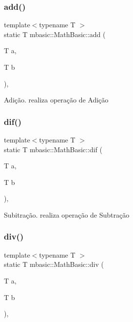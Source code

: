 \subsubsection{\texorpdfstring{add()}{add()}}
{\footnotesize\ttfamily template$<$typename T $>$ \\
static T mbasic\+::\+Math\+Basic\+::add (\begin{DoxyParamCaption}\item[{T}]{a,  }\item[{T}]{b }\end{DoxyParamCaption})\hspace{0.3cm}{\ttfamily [inline]}, {\ttfamily [static]}}

Adição. realiza operação de Adição \mbox{\label{classmbasic_1_1MathBasic_a8e4fc1aeb5b39aad18a5753577f79aba}} 
\subsubsection{\texorpdfstring{dif()}{dif()}}
{\footnotesize\ttfamily template$<$typename T $>$ \\
static T mbasic\+::\+Math\+Basic\+::dif (\begin{DoxyParamCaption}\item[{T}]{a,  }\item[{T}]{b }\end{DoxyParamCaption})\hspace{0.3cm}{\ttfamily [inline]}, {\ttfamily [static]}}

Subitração. realiza operação de Subtração \mbox{\label{classmbasic_1_1MathBasic_a855d9d4ef811aa9ca166e5040591cdc6}} 
\subsubsection{\texorpdfstring{div()}{div()}}
{\footnotesize\ttfamily template$<$typename T $>$ \\
static T mbasic\+::\+Math\+Basic\+::div (\begin{DoxyParamCaption}\item[{T}]{a,  }\item[{T}]{b }\end{DoxyParamCaption})\hspace{0.3cm}{\ttfamily [inline]}, {\ttfamily [static]}}

